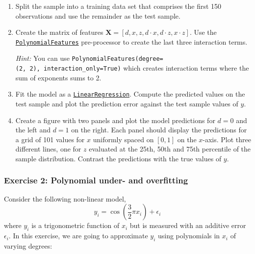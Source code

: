 \documentclass{scrartcl}
\begin{document}
\begin{enumerate}
\def\labelenumi{\arabic{enumi}.}
\item
  Split the sample into a training data set that comprises the first 150
  observations and use the remainder as the test sample.
\item
  Create the matrix of features
  \(\mathbf{X} = [d, x, z, d\cdot x, d\cdot z, x\cdot z]\). Use the
  \href{https://scikit-learn.org/stable/modules/generated/sklearn.preprocessing.PolynomialFeatures.html}{\texttt{PolynomialFeatures}}
  pre-processor to create the last three interaction terms.

  \emph{Hint:} You can use
  \texttt{PolynomialFeatures(degree=(2,\ 2),\ interaction\_only=True)}
  which creates interaction terms where the sum of exponents sums to 2.
\item
  Fit the model as a
  \href{https://scikit-learn.org/stable/modules/generated/sklearn.linear_model.LinearRegression.html}{\texttt{LinearRegression}}.
  Compute the predicted values on the test sample and plot the
  prediction error against the test sample values of \(y\).
\item
  Create a figure with two panels and plot the model predictions for
  \(d=0\) and the left and \(d=1\) on the right. Each panel should
  display the predictions for a grid of 101 values for \(x\) uniformly
  spaced on \([0, 1]\) on the \(x\)-axis. Plot three different lines,
  one for \(z\) evaluated at the 25th, 50th and 75th percentile of the
  sample distribution. Contrast the predictions with the true values of
  \(y\).
\end{enumerate}

    \hypertarget{exercise-2-polynomial-under--and-overfitting}{%
\subsubsection{Exercise 2: Polynomial under- and
overfitting}\label{exercise-2-polynomial-under--and-overfitting}}

Consider the following non-linear model, \[
y_i = \cos\left(\frac{3}{2} \pi x_i \right) + \epsilon_i
\] where \(y_i\) is a trigonometric function of \(x_i\) but is measured
with an additive error \(\epsilon_i\). In this exercise, we are going to
approximate \(y_i\) using polynomials in \(x_i\) of varying degrees:
\end{document}
